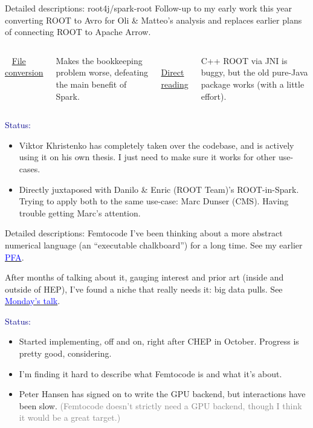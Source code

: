 \begin{frame}{Detailed descriptions: root4j/spark-root}
\vspace{0.5 cm}
Follow-up to my early work this year converting ROOT to Avro for Oli \& Matteo's analysis and replaces earlier plans of connecting ROOT to Apache Arrow.

\vspace{0.3 cm}
\begin{columns}[t]
\mbox{ } \hfill \underline{File conversion} \hfill \mbox{ }

\vspace{0.1 cm}
Makes the bookkeeping problem worse, defeating the main benefit of Spark.

\mbox{ } \hfill \underline{Direct reading} \hfill \mbox{ }

\vspace{0.1 cm}
C++ ROOT via JNI is buggy, but the old pure-Java package works (with a little effort).
\end{columns}

\vspace{0.4 cm}
\textcolor{darkblue}{Status:}
\begin{itemize}
\item Viktor Khristenko has completely taken over the codebase, and is actively using it on his own thesis. I just need to make sure it works for other use-cases.
\item Directly juxtaposed with Danilo \& Enric (ROOT Team)'s ROOT-in-Spark. Trying to apply both to the same use-case: Marc Dunser (CMS). Having trouble getting Marc's attention.
\end{itemize}
\end{frame}

\begin{frame}{Detailed descriptions: Femtocode}
\vspace{0.5 cm}
I've been thinking about a more abstract numerical language (an ``executable chalkboard'') for a long time. See my earlier \href{http://dmg.org/pfa/}{\textcolor{blue}{PFA}}.

\vspace{0.3 cm}
After months of talking about it, gauging interest and prior art (inside and outside of HEP), I've found a niche that really needs it: big data pulls. See \href{https://indico.cern.ch/event/594180/}{\textcolor{blue}{Monday's talk}}.

\vspace{0.4 cm}
\textcolor{darkblue}{Status:}
\begin{itemize}
\item Started implementing, off and on, right after CHEP in October. Progress is pretty good, considering.
\item I'm finding it hard to describe what Femtocode is and what it's about.
\item Peter Hansen has signed on to write the GPU backend, but interactions have been slow. \textcolor{gray}{(Femtocode doesn't strictly need a GPU backend, though I think it would be a great target.)}
\end{itemize}
\end{frame}

